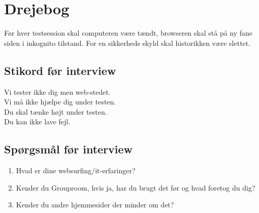 \documentclass[12pt]{article}
\begin{document}
\section{Drejebog}
Før hver testsession skal computeren være tændt, browseren skal stå på ny fane siden i inkognito tilstand. For en sikkerheds skyld skal historikken være slettet.
\subsection{Stikord før interview}
Vi tester ikke dig men web-stedet. \\
Vi må ikke hjælpe dig under testen. \\
Du skal tænke højt under testen. \\
Du kan ikke lave fejl.
\subsection{Spørgsmål før interview}
\begin{enumerate}
  \item Hvad er dine websurfing/it-erfaringer?
  \item Kender du Grouproom, hvis ja, har du brugt det før og hvad foretog du dig?
  \item Kender du andre hjemmesider der minder om det?
\end{enumerate}
\end{document}
